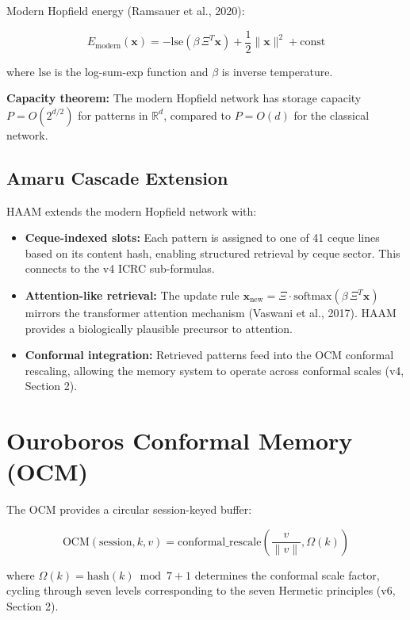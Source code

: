 \documentclass[11pt]{article}
\theoremstyle{plain}
\begin{document}
Modern Hopfield energy (Ramsauer et al., 2020):

\begin{equation}
E_{\text{modern}}(\mathbf{x}) = -\text{lse}(\beta \, \Xi^T \mathbf{x}) + \frac{1}{2}\|\mathbf{x}\|^2 + \text{const}
\end{equation}

where \( \text{lse} \) is the log-sum-exp function and \( \beta \) is inverse temperature.

\textbf{Capacity theorem:} The modern Hopfield network has storage capacity \( P = O(2^{d/2}) \) for patterns in \( \mathbb{R}^d \), compared to \( P = O(d) \) for the classical network.

\subsection{Amaru Cascade Extension}

HAAM extends the modern Hopfield network with:

\begin{itemize}
  \item \textbf{Ceque-indexed slots:} Each pattern is assigned to one of 41 ceque lines based on its content hash, enabling structured retrieval by ceque sector. This connects to the v4 ICRC sub-formulas.
  \item \textbf{Attention-like retrieval:} The update rule \( \mathbf{x}_{\text{new}} = \Xi \cdot \text{softmax}(\beta \, \Xi^T \mathbf{x}) \) mirrors the transformer attention mechanism (Vaswani et al., 2017). HAAM provides a biologically plausible precursor to attention.
  \item \textbf{Conformal integration:} Retrieved patterns feed into the OCM conformal rescaling, allowing the memory system to operate across conformal scales (v4, Section 2).
\end{itemize}


\section{Ouroboros Conformal Memory (OCM)}

The OCM provides a circular session-keyed buffer:

\begin{equation}
\text{OCM}(\text{session}, k, v) = \text{conformal\_rescale}\left(\frac{v}{\|v\|}, \Omega(k)\right)
\end{equation}

where \( \Omega(k) = \text{hash}(k) \bmod 7 + 1 \) determines the conformal scale factor, cycling through seven levels corresponding to the seven Hermetic principles (v6, Section 2).
\end{document}
